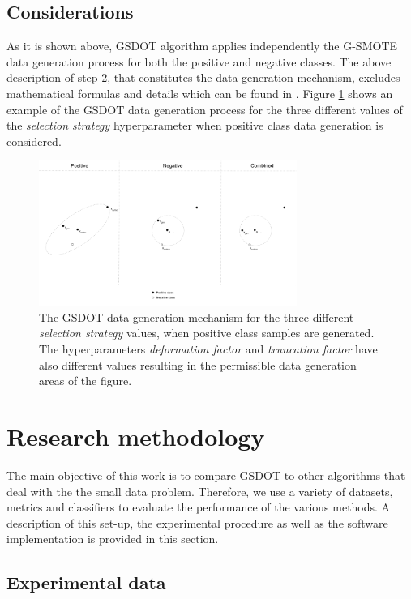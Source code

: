 \subsection{Considerations}

As it is shown above, GSDOT algorithm applies independently the G-SMOTE data generation process for both the positive and negative classes. The above description of step 2, that constitutes the data generation mechanism,  excludes mathematical formulas and details which can be found in \cite{Douzas.2019}. Figure \ref{fig:gsmotemechanism} shows an example of the GSDOT data generation process for the three different values of the \textit{selection strategy} hyperparameter when positive class data generation is considered.

\begin{figure}
	\centering
	\includegraphics[width=0.75\textwidth]{../analysis/gsmote_mechanism.png}
	\caption{The GSDOT data generation mechanism for the three  different \textit{selection strategy} values, when positive class samples are generated. The hyperparameters \textit{deformation factor} and \textit{truncation factor} have also different values resulting in the permissible data generation areas of the figure.}
	\label{fig:gsmotemechanism}
\end{figure}

\section{Research methodology}
\label{research}

The main objective of this work is to compare GSDOT to other algorithms that deal with the the small data problem. Therefore, we use a variety of datasets, metrics and classifiers to evaluate the performance of the various methods. A description of this set-up, the experimental procedure as well as the software implementation is provided in this section.

\subsection{Experimental data}

